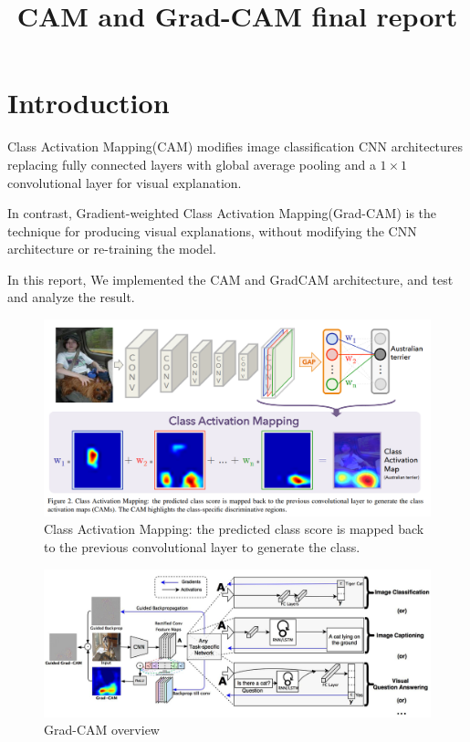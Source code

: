 \documentclass[extendedabs]{bmvc2k}
\begin{document}
\title{CAM and Grad-CAM final report}

 

\maketitle
\noindent

\section{Introduction}
Class Activation Mapping(CAM)\cite{cam} modifies image classification CNN architectures replacing fully connected layers with global average pooling and a $1\times1$ convolutional layer for visual explanation.
 
In contrast, Gradient-weighted Class Activation Mapping(Grad-CAM)\cite{gradcam} is the technique for producing visual explanations, without modifying the CNN architecture or re-training the model.

In this report, We implemented the CAM\cite{cam} and GradCAM\cite{gradcam} architecture, and test and analyze the result.

\begin{figure}[t]
\centering
	\includegraphics[width=\linewidth]{images/cam.PNG}
	\caption{
		Class Activation Mapping: the predicted class score is mapped back to the previous convolutional layer to generate the class.}
	\vspace{-2mm}
        \label{fig:cam overview}
\end{figure}

\begin{figure}[t]
\centering
	\includegraphics[width=\linewidth]{images/fig1.PNG}
	\caption{
		Grad-CAM overview}
	\vspace{-2mm}
        \label{fig:gradcamoverview}
\end{figure}
\end{document}
